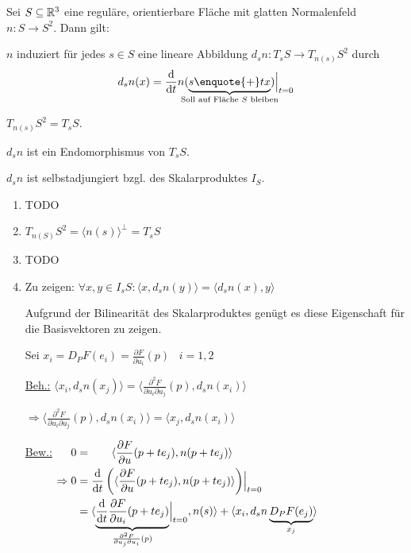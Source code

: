 \begin{proposition}
    Sei $S \subseteq \mathbb{R}^3$ eine reguläre, orientierbare Fläche mit glatten
    Normalenfeld $n: S \rightarrow S^2$. Dann gilt:

    \begin{propenum}
        \item $n$ induziert für jedes $s \in S$ eine lineare Abbildung $d_s n: T_s S \rightarrow T_{n(s)} S^2$
              durch 
              \[d_s n(x) = \frac{\mathrm{d}}{\mathrm{d} t} n (\underbrace{s \text{\enquote{+}} tx}_{\mathclap{\text{Soll auf Fläche $S$ bleiben}}}) \Bigr |_{t=0}\]
        \item $T_{n(s)} S^2 = T_s S$.
        \item $d_s n$ ist ein Endomorphismus von $T_s S$.
        \item $d_s n$ ist selbstadjungiert bzgl. des Skalarproduktes $I_S$.
    \end{propenum}
\end{proposition}

\begin{beweis}\leavevmode
    \begin{enumerate}[label=\alph*)]
        \item TODO
        \item $T_{n(S)} S^2 = \langle n(s) \rangle^\perp = T_s S$
        \item TODO
        \item Zu zeigen: $\forall x,y \in I_s S: \langle x, d_s n (y) \rangle = \langle d_s n(x), y \rangle$

        Aufgrund der Bilinearität des Skalarproduktes genügt es diese Eigenschaft
        für die Basisvektoren zu zeigen.

        Sei $x_i = D_P F(e_i) = \frac{\partial F}{\partial u_i} (p)\;\;\; i = 1,2$

        \underline{Beh.:} 
          $\langle x_i, d_s n(x_j) \rangle = \langle \frac{\partial^2 F}{\partial u_i \partial u_j} (p), d_s n (x_i) \rangle$

        $\Rightarrow \langle \frac{\partial^2 F}{\partial u_i \partial u_j} (p), d_s n (x_i) \rangle = \langle x_j, d_s n (x_i) \rangle$

        \underline{Bew.:} $
        \begin{aligned}[t]
            0 &= \hphantom{\frac{\mathrm{d}}{\mathrm{d}t} \left (\right.} \langle \frac{\partial F}{\partial u} (p + t e_j), n(p + t e_j) \rangle\\
\Rightarrow 0 &= \frac{\mathrm{d}}{\mathrm{d}t} \left (\langle \frac{\partial F}{\partial u} (p + t e_j), n(p + t e_j) \rangle \right) \Bigr |_{t=0}\\
              &= \langle \underbrace{\frac{\mathrm{d}}{\mathrm{d}t} \frac{\partial F}{\partial u_i} (p + t e_j)}_{\frac{\partial^2 F}{\partial u_j \partial u_i} (p)} \Bigr |_{t=0}, n(s) \rangle + \langle x_i, d_s n \underbrace{D_P F (e_j)}_{x_j}\rangle
        \end{aligned}$
    \end{enumerate}
\end{beweis}

